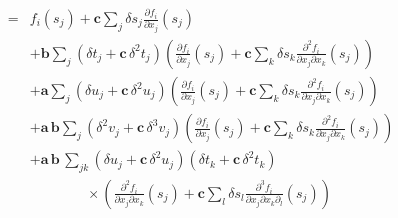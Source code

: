 \documentclass[11pt]{article}
\begin{document}
\begin{align*}
\\
%
=&
f_{i} \! \left( s_{j} \right) + \mathbf{c} \sum_{j} \delta s_{j} 
\frac{ \partial f_{i} }{ \partial x_{j} } \! \left( s_{j} \right)
\\
&+ 
\mathbf{b}
\sum_{j} \left( \delta t_{j} + \mathbf{c} \, \delta^{2} t_{j} \right) 
\left( \frac{ \partial f_{i} }{ \partial x_{j} } \! \left( s_{j} \right) 
+  \mathbf{c} \sum_{k} \delta s_{k} 
\frac{ \partial^{2} f_{i} }{ \partial x_{j} \partial x_{k} } \! \left( s_{j} \right) \right)
\\
&+ 
\mathbf{a} \sum_{j}
\left( \delta u_{j} + \mathbf{c} \, \delta^{2} u_{j} \right) 
\left( \frac{ \partial f_{i} }{ \partial x_{j} } \! \left( s_{j} \right) 
+ \mathbf{c} \sum_{k} \delta s_{k} 
\frac{ \partial^{2} f_{i} }{ \partial x_{j} \partial x_{k} } \! \left( s_{j} \right) \right)
\\
& + \mathbf{a} \, \mathbf{b} \sum_{j}
\left( \delta^{2} v_{j} + \mathbf{c} \, \delta^{3} v_{j} \right) 
\left( \frac{ \partial f_{i} }{ \partial x_{j} } \! \left( s_{j} \right) 
+ \mathbf{c} \sum_{k} \delta s_{k} 
\frac{ \partial^{2} f_{i} }{ \partial x_{j} \partial x_{k} } \! \left( s_{j} \right) \right)
\\
&+ 
\mathbf{a} \, \mathbf{b} \, \sum_{jk} 
\left( \delta u_{j} + \mathbf{c} \, \delta^{2} u_{j} \right) 
\left( \delta t_{k} + \mathbf{c} \, \delta^{2} t_{k} \right)
\\
& \quad\quad\quad\quad \times \left(
\frac{ \partial^{2} f_{i} }{ \partial x_{j} \partial x_{k} } \! \left( s_{j} \right) 
+ \mathbf{c} \sum_{l} \delta s_{l} 
\frac{ \partial^{3} f_{i} }{ \partial x_{j} \partial x_{k} \partial_{l} } \! \left( s_{j} \right)
\right)
\\
%
\end{align*}
\end{document}

